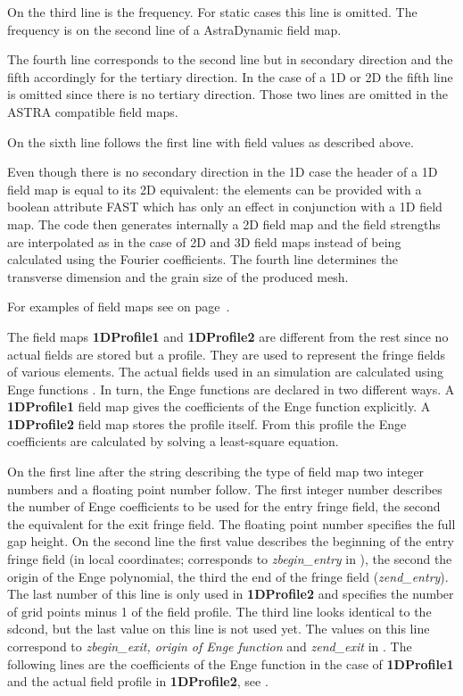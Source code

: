 On the third line is the frequency. For static cases this line is omitted. The frequency is on the second line of a AstraDynamic field map.

The fourth line corresponds to the second line but in secondary direction and the fifth accordingly for the tertiary direction. In the case of a 1D or 2D the fifth line is omitted since there is no tertiary direction. Those two lines are omitted in the ASTRA compatible field maps.

On the sixth line follows the first line with field values as described above.

Even though there is no secondary direction in the 1D case the header of a 1D field map is equal to its 2D equivalent: the elements can be provided with a boolean attribute FAST which has only an effect in conjunction with a 1D field map. The code then generates internally a 2D field map and the field strengths are interpolated as in the case of 2D and 3D field maps instead of being calculated using the Fourier coefficients. The fourth line determines the transverse dimension and the grain size of the produced mesh.

For examples of field maps see  on page~\pageref{chp:app_fieldmaps}.

The field maps {\bf 1DProfile1} and {\bf 1DProfile2} are different from the rest since no actual fields are stored but a profile. They are used to represent the fringe fields of various elements. The actual fields used in an \opalt simulation are calculated using Enge functions \cite{enge}. In turn, the Enge functions are declared in two different ways. A {\bf 1DProfile1} field map gives the coefficients of the Enge function explicitly. A {\bf 1DProfile2} field map stores the profile itself. From this profile the Enge coefficients are calculated by solving a least-square equation.

On the first line after the string describing the type of field map two integer numbers and a floating point number follow. The first integer number describes the number of Enge coefficients to be used for the entry fringe field, the second the equivalent for the exit fringe field. The floating point number specifies the full gap height. On the second line the first value describes the beginning of the entry fringe field (in local coordinates; corresponds to {\sl zbegin\_entry} in ), the second the origin of the Enge polynomial, the third the end of the fringe field ({\sl zend\_entry}). The last number of this line is only used in {\bf 1DProfile2} and specifies the number of grid points minus 1 of the field profile. The third line looks identical to the sdcond, but the last value on this line is not used yet. The values on this line correspond to {\sl zbegin\_exit, origin of Enge function} and {\sl zend\_exit} in . The following lines are the coefficients of the Enge function in the case of {\bf 1DProfile1} and the actual field profile in {\bf 1DProfile2}, see .

